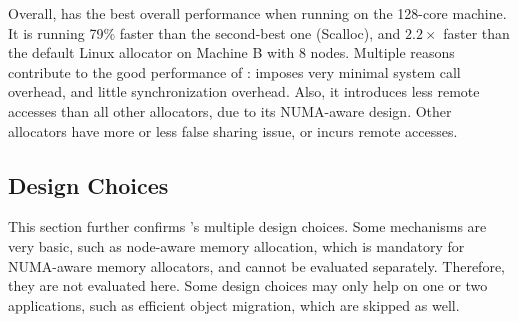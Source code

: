 Overall,  \NM{} has the best overall performance when running on the 128-core machine. It is running 79\% faster than the second-best one (Scalloc), and $2.2\times$ faster than the default Linux allocator on Machine B with 8 nodes. Multiple reasons contribute to the good performance of \NM{}: \NM{} imposes very minimal system call overhead, and little synchronization overhead. Also, it introduces less remote accesses than all other allocators, due to its NUMA-aware design. Other allocators have more or less false sharing issue, or incurs remote accesses.  




 

\subsection{Design Choices}
\label{sec:design}

This section further confirms \NM{}'s multiple design choices. Some mechanisms are very basic, such as node-aware memory allocation, which is mandatory for NUMA-aware memory allocators, and cannot be evaluated separately. Therefore, they are not evaluated here. Some design choices may only help on one or two applications, such as efficient object migration, which are skipped as well.  

